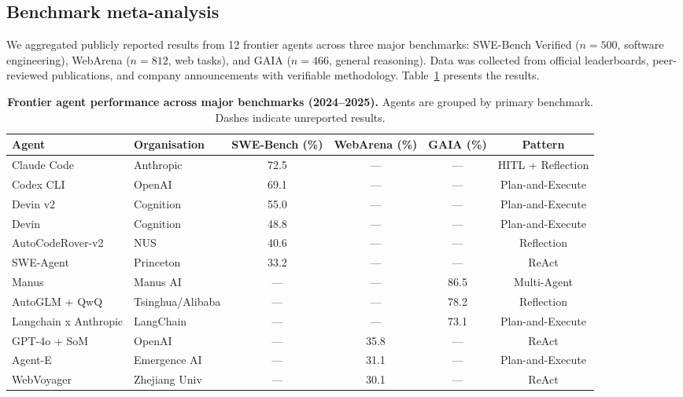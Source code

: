 \documentclass[10pt]{article}
\begin{document}
\subsection*{Benchmark meta-analysis}

We aggregated publicly reported results from 12 frontier agents across three major benchmarks: SWE-Bench Verified\cite{jimenez2024swebench} ($n=500$, software engineering), WebArena\cite{zhou2024webarena} ($n=812$, web tasks), and GAIA\cite{mialon2023gaia} ($n=466$, general reasoning). Data was collected from official leaderboards, peer-reviewed publications, and company announcements with verifiable methodology. Table~\ref{tab:benchmarks} presents the results.

\begin{table}[ht]
\centering
\caption{\textbf{Frontier agent performance across major benchmarks (2024--2025).} Agents are grouped by primary benchmark. Dashes indicate unreported results.}
\label{tab:benchmarks}
\begin{tabular}{llcccc}
\toprule
\textbf{Agent} & \textbf{Organisation} & \textbf{SWE-Bench (\%)} & \textbf{WebArena (\%)} & \textbf{GAIA (\%)} & \textbf{Pattern} \\
\midrule
Claude Code         & Anthropic      & 72.5 & ---  & ---  & HITL + Reflection \\
Codex CLI           & OpenAI         & 69.1 & ---  & ---  & Plan-and-Execute \\
Devin v2            & Cognition      & 55.0 & ---  & ---  & Plan-and-Execute \\
Devin               & Cognition      & 48.8 & ---  & ---  & Plan-and-Execute \\
AutoCodeRover-v2    & NUS            & 40.6 & ---  & ---  & Reflection \\
SWE-Agent           & Princeton      & 33.2 & ---  & ---  & ReAct \\
Manus               & Manus AI       & ---  & ---  & 86.5 & Multi-Agent \\
AutoGLM + QwQ       & Tsinghua/Alibaba & --- & ---  & 78.2 & Reflection \\
Langchain x Anthropic & LangChain    & ---  & ---  & 73.1 & Plan-and-Execute \\
GPT-4o + SoM        & OpenAI         & ---  & 35.8 & ---  & ReAct \\
Agent-E             & Emergence AI   & ---  & 31.1 & ---  & Plan-and-Execute \\
WebVoyager          & Zhejiang Univ  & ---  & 30.1 & ---  & ReAct \\
\bottomrule
\end{tabular}
\end{table}
\end{document}
